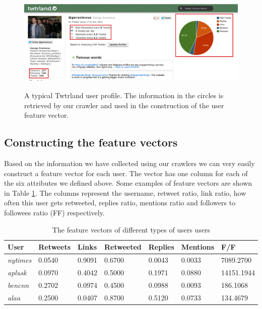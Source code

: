 \begin{figure}[htbp]
  \begin{center}
    \includegraphics[height=1.9in, width=6in]{twtrland-page}
    \caption{A typical Twtrland user profile. The information in the circles is retrieved by our crawler and used in the construction of the user feature vector.}
    \label{TwtrlandPage}
  \end{center}
\end{figure} 

\subsection{Constructing the feature vectors}
Based on the information we have collected using our crawlers we can very easily construct a feature vector for each user. The vector has one column for each of the six attributes we 
defined above. Some examples of feature vectors are shown in Table \ref{FeatureVectors}. The columns represent the username, retweet ratio, link ratio, how often this user gets retweeted, replies ratio, mentions ratio and followers to followees ratio (FF) respectively. 

\begin{table}[htbp]
\footnotesize
\centering
\begin{tabular}{ l  l  l  l  l  l  l }
  \hline
  \textbf{User} & \textbf{Retweets} & \textbf{Links} & \textbf{Retweeted} & \textbf{Replies} & \textbf{Mentions} & \textbf{F/F} \\ \hline
  \emph{nytimes} & 0.0540 & 0.9091 & 0.6700 & 0.0043 & 0.0033 & 7089.2700 \\
  \emph{aplusk} & 0.0970 & 0.4042 & 0.5000 & 0.1971 & 0.0880 & 14151.1944 \\
  \emph{bencnn} & 0.2702 & 0.0974 & 0.4500 & 0.0988 & 0.0093 & 186.1068 \\
  \emph{alaa} & 0.2500 & 0.0407 & 0.8700 & 0.5120 & 0.0733 & 134.4679 \\
  \hline
\end{tabular}
\caption{The feature vectors of different types of users users}
\label{FeatureVectors}
\end{table}


